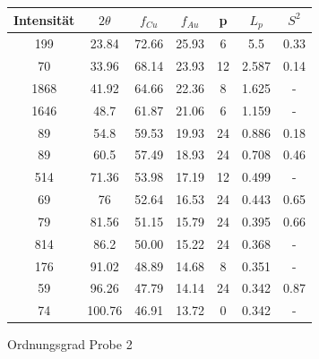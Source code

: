                 \begin{figure}[H]
                    \centering
                    \begin{tabular}{c | c | c | c | c | c | c}
                        Intensität & $2\theta$ & $f_{Cu}$ & $f_{Au}$ & p & $L_p$ & $S^2$\\
                        \hline
                        199 & 23.84 & 72.66 & 25.93 & 6 & 5.5 & 0.33\\
                        70 & 33.96 & 68.14 & 23.93 & 12 & 2.587 & 0.14\\
                        1868 & 41.92 & 64.66 & 22.36 & 8 & 1.625 & -\\
                        1646 & 48.7 & 61.87 & 21.06 & 6 & 1.159 & -\\
                        89 & 54.8 & 59.53 & 19.93 & 24 & 0.886 & 0.18\\
                        89 & 60.5 & 57.49 & 18.93 & 24 & 0.708 & 0.46\\
                        514 & 71.36 & 53.98 & 17.19 & 12 & 0.499 & -\\
                        69 & 76 & 52.64 & 16.53 & 24 & 0.443 & 0.65\\
                        79 & 81.56 & 51.15 & 15.79 & 24 & 0.395 & 0.66\\
                        814 & 86.2 & 50.00 & 15.22 & 24 & 0.368 & -\\
                        176 & 91.02 & 48.89 & 14.68 & 8 & 0.351 & -\\
                        59 & 96.26 & 47.79 & 14.14 & 24 & 0.342 & 0.87\\
                        74 & 100.76 & 46.91 & 13.72 & 0 & 0.342 & -\\
                    \end{tabular}
                    \caption{Ordnungsgrad Probe 2}
                \end{figure}

